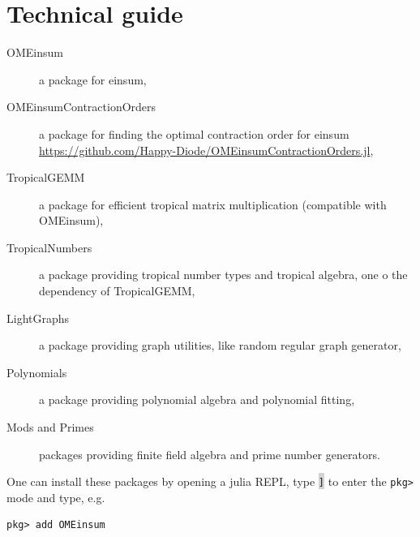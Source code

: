 \documentclass{article}
\newcommand{\<}{\langle}
\renewcommand{\>}{\rangle}
\theoremstyle{definition}\newtheorem{definition}{\textit{Definition}}
\begin{document}
\section{Technical guide}
\begin{description}
	\item[OMEinsum] a package for einsum,
	\item[OMEinsumContractionOrders] a package for finding the optimal contraction order for einsum \\ \href{https://github.com/Happy-Diode/OMEinsumContractionOrders.jl}{https://github.com/Happy-Diode/OMEinsumContractionOrders.jl},
	\item[TropicalGEMM] a package for efficient tropical matrix multiplication (compatible with OMEinsum),
	\item[TropicalNumbers] a package providing tropical number types and tropical algebra, one o the dependency of TropicalGEMM,
	\item[LightGraphs] a package providing graph utilities, like random regular graph generator,
	\item[Polynomials] a package providing polynomial algebra and polynomial fitting,
	\item[Mods and Primes] packages providing finite field algebra and prime number generators.
\end{description}

One can install these packages by opening a julia REPL, type \colorbox{lightgray}{\texttt{]}} to enter the \texttt{pkg>} mode and type, e.g.
\begin{lstlisting}
pkg> add OMEinsum
\end{lstlisting}
\end{document}

